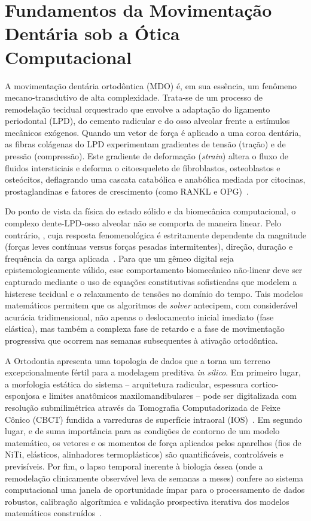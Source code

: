 \section{Fundamentos da Movimentação Dentária sob a Ótica Computacional}

A movimentação dentária ortodôntica (MDO) é, em sua essência, um fenômeno mecano-transdutivo de alta complexidade. Trata-se de um processo de remodelação tecidual orquestrado que envolve a adaptação do ligamento periodontal (LPD), do cemento radicular e do osso alveolar frente a estímulos mecânicos exógenos. Quando um vetor de força é aplicado a uma coroa dentária, as fibras colágenas do LPD experimentam gradientes de tensão (tração) e de pressão (compressão). Este gradiente de deformação (\textit{strain}) altera o fluxo de fluidos intersticiais e deforma o citoesqueleto de fibroblastos, osteoblastos e osteócitos, deflagrando uma cascata catabólica e anabólica mediada por citocinas, prostaglandinas e fatores de crescimento (como RANKL e OPG)~\cite{zhang2024recursive}.

Do ponto de vista da física do estado sólido e da biomecânica computacional, o complexo dente-LPD-osso alveolar não se comporta de maneira linear. Pelo contrário, , cuja resposta fenomenológica é estritamente dependente da magnitude (forças leves contínuas versus forças pesadas intermitentes), direção, duração e frequência da carga aplicada~\cite{khoshfekr2025digital}. Para que um gêmeo digital seja epistemologicamente válido, esse comportamento biomecânico não-linear deve ser capturado mediante o uso de equações constitutivas sofisticadas que modelem a histerese tecidual e o relaxamento de tensões no domínio do tempo. Tais modelos matemáticos permitem que os algoritmos de \textit{solver} antecipem, com considerável acurácia tridimensional, não apenas o deslocamento inicial imediato (fase elástica), mas também a complexa fase de retardo e a fase de movimentação progressiva que ocorrem nas semanas subsequentes à ativação ortodôntica.

A Ortodontia apresenta uma topologia de dados que a torna um terreno excepcionalmente fértil para a modelagem preditiva \textit{in silico}. Em primeiro lugar, a morfologia estática do sistema -- arquitetura radicular, espessura cortico-esponjosa e limites anatômicos maxilomandibulares -- pode ser digitalizada com resolução submilimétrica através da Tomografia Computadorizada de Feixe Cônico (CBCT) fundida a varreduras de superfície intraoral (IOS)~\cite{katsoulakis2024digital}. Em segundo lugar, e de suma importância para as condições de contorno de um modelo matemático, os vetores e os momentos de força aplicados pelos aparelhos (fios de NiTi, elásticos, alinhadores termoplásticos) são quantificáveis, controláveis e previsíveis. Por fim, o lapso temporal inerente à biologia óssea (onde a remodelação clinicamente observável leva de semanas a meses) confere ao sistema computacional uma janela de oportunidade ímpar para o processamento de dados robustos, calibração algorítmica e validação prospectiva iterativa dos modelos matemáticos construídos~\cite{duggal2026exploring}.
